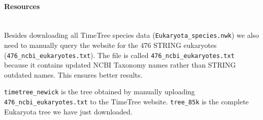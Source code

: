 \hypertarget{resources}{%
\paragraph{Resources}\label{resources}}

\texttt{}\\
Besides downloading all TimeTree species data
(\texttt{Eukaryota\_species.nwk}) we also need to manually query the
website for the 476 STRING eukaryotes
(\texttt{476\_ncbi\_eukaryotes.txt}). The file is called
\texttt{476\_ncbi\_eukaryotes.txt} because it contains updated NCBI
Taxonomy names rather than STRING outdated names. This ensures better
results.

\begin{Shaded}
\begin{Highlighting}[]
\NormalTok{(}
  \NormalTok{(}\NormalTok{,}
         \NormalTok{,}
         \NormalTok{,}
         \NormalTok{),}
\NormalTok{)}
\end{Highlighting}
\end{Shaded}

\texttt{timetree\_newick} is the tree obtained by manually uploading
\texttt{476\_ncbi\_eukaryotes.txt} to the TimeTree website.
\texttt{tree\_85k} is the complete Eukaryota tree we have just
downloaded.

\begin{Shaded}
\begin{Highlighting}[]
\NormalTok{(}\NormalTok{)}

\StringTok{ }\NormalTok{(}\NormalTok{)}

\StringTok{ }\NormalTok{(}\NormalTok{, } \NormalTok{)}

\StringTok{ }\NormalTok{(}\NormalTok{)}
\end{Highlighting}
\end{Shaded}

